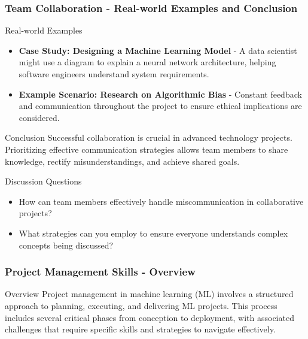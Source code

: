 \documentclass[aspectratio=169]{beamer}
\begin{document}
\begin{frame}[fragile]
    \frametitle{Team Collaboration - Real-world Examples and Conclusion}
    \begin{block}{Real-world Examples}
        \begin{itemize}
            \item \textbf{Case Study: Designing a Machine Learning Model}
                - A data scientist might use a diagram to explain a neural network architecture, helping software engineers understand system requirements.
            \item \textbf{Example Scenario: Research on Algorithmic Bias}
                - Constant feedback and communication throughout the project to ensure ethical implications are considered.
        \end{itemize}
    \end{block}
    \begin{block}{Conclusion}
        Successful collaboration is crucial in advanced technology projects. Prioritizing effective communication strategies allows team members to share knowledge, rectify misunderstandings, and achieve shared goals.
    \end{block}
    \begin{block}{Discussion Questions}
        \begin{itemize}
            \item How can team members effectively handle miscommunication in collaborative projects?
            \item What strategies can you employ to ensure everyone understands complex concepts being discussed?
        \end{itemize}
    \end{block}
\end{frame}

\begin{frame}[fragile]
    \frametitle{Project Management Skills - Overview}
    \begin{block}{Overview}
        Project management in machine learning (ML) involves a structured approach to planning, executing, and delivering ML projects. This process includes several critical phases from conception to deployment, with associated challenges that require specific skills and strategies to navigate effectively.
    \end{block}
\end{frame}
\end{document}
